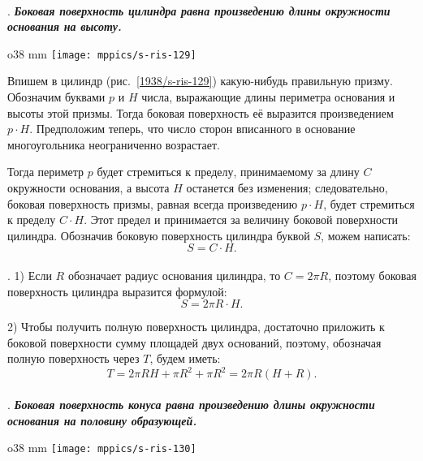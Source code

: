 \paragraph{}\label{1938/s112}
.
\textbf{\emph{Боковая поверхность цилиндра равна произведению длины окружности основания на высоту.}}

\begin{wrapfigure}{o}{38 mm}
\vskip-0mm
\centering
\texttt{[image: mppics/s-ris-129]}
\caption{}\label{1938/s-ris-129}
\vskip-0mm
\end{wrapfigure}

Впишем в цилиндр (рис.~\ref{1938/s-ris-129}) какую-нибудь правильную призму.
Обозначим буквами $p$ и $H$ числа, выражающие длины периметра основания и высоты этой призмы.
Тогда боковая поверхность её выразится произведением $p\cdot H$.
Предположим теперь, что число сторон вписанного в основание многоугольника неограниченно возрастает.

Тогда периметр $p$ будет стремиться к пределу, принимаемому за длину $C$ окружности основания, а высота $H$ останется без изменения;
следовательно, боковая поверхность призмы, равная всегда произведению $p\cdot H$, будет стремиться к пределу $C\cdot H$.
Этот предел и принимается за величину боковой поверхности цилиндра.
Обозначив боковую поверхность цилиндра буквой $S$, можем написать:
\[S = C\cdot H.\]

\paragraph{}\label{1938/s113}
. 1) Если $R$ обозначает радиус основания цилиндра, то $C= 2\pi R$, поэтому боковая поверхность цилиндра выразится формулой:
\[S = 2\pi R \cdot H.\]

2) Чтобы получить полную поверхность цилиндра, достаточно приложить к боковой поверхности сумму площадей двух оснований, поэтому, обозначая полную поверхность через $T$, будем иметь:
\[T= 2\pi RH + \pi R^2 + \pi R^2 = 2\pi R(H + R).\]

\paragraph{}\label{1938/s114}
.
\textbf{\emph{Боковая поверхность конуса равна произведению длины окружности основания на половину образующей.}}

\begin{wrapfigure}{o}{38 mm}
\vskip-0mm
\centering
\texttt{[image: mppics/s-ris-130]}
\caption{}\label{1938/s-ris-130}
\vskip-0mm
\end{wrapfigure}

